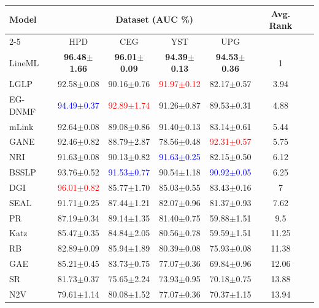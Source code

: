 \documentclass[pdflatex,sn-mathphys-num]{sn-jnl}%
\theoremstyle{thmstyleone}%
\theoremstyle{thmstyletwo}%
\theoremstyle{thmstylethree}%
\theoremstyle{plain} %
\theoremstyle{definition} %
\theoremstyle{remark} %
\theoremstyle{plain} %
\begin{document}
\begin{table}[ht!]
\begin{tabular}{@{}lcccccr@{}}
\end{tabular}

\begin{tabular}{@{}lcccccr@{}}
\toprule
\multirow{2}{*}{Model} & \multicolumn{4}{c}{Dataset (AUC \%)} & \multirow{2}{*}{Avg. Rank} \\
\cmidrule(lr){2-5}
& HPD & CEG & YST & UPG & \\
\midrule
LineML & \textbf{96.48$\pm$1.66} & \textbf{96.01$\pm$0.09} & \textbf{94.39$\pm$0.13} & \textbf{94.53$\pm$0.36} & 1 \\
LGLP & 92.58$\pm$0.08 & 90.16$\pm$0.76 & \textcolor{red}{91.97$\pm$0.12} & 82.17$\pm$0.57 & 3.94 \\
EG-DNMF & \textcolor{blue}{94.49$\pm$0.37} & \textcolor{red}{92.89$\pm$1.74} & 91.26$\pm$0.87 & 89.53$\pm$0.31 & 4.88 \\
mLink & 92.64$\pm$0.08 & 89.08$\pm$0.86 & 91.40$\pm$0.13 & 83.14$\pm$0.61 & 5.44 \\
GANE & 92.46$\pm$0.82 & 88.79$\pm$2.87 & 78.56$\pm$0.48 & \textcolor{red}{92.31$\pm$0.57} & 5.75 \\
NRI & 91.63$\pm$0.08 & 90.13$\pm$0.82 & \textcolor{blue}{91.63$\pm$0.25} & 82.15$\pm$0.50 & 6.12 \\
BSSLP & 93.76$\pm$0.52 & \textcolor{blue}{91.53$\pm$0.77} & 90.54$\pm$1.18 & \textcolor{blue}{90.92$\pm$0.05} & 6.25 \\
DGI & \textcolor{red}{96.01$\pm$0.82} & 85.77$\pm$1.70 & 85.03$\pm$0.55 & 83.43$\pm$0.16 & 7 \\
SEAL & 91.71$\pm$0.25 & 87.44$\pm$1.21 & 82.07$\pm$0.96 & 81.37$\pm$0.93 & 7.62 \\
PR & 87.19$\pm$0.34 & 89.14$\pm$1.35 & 81.40$\pm$0.75 & 59.88$\pm$1.51 & 9.5 \\
Katz & 85.47$\pm$0.35 & 84.84$\pm$2.05 & 80.56$\pm$0.78 & 59.59$\pm$1.51 & 11.25 \\
RB & 82.89$\pm$0.09 & 85.94$\pm$1.89 & 80.39$\pm$0.08 & 75.93$\pm$0.08 & 11.38 \\
GAE & 85.21$\pm$0.45 & 83.73$\pm$0.75 & 77.07$\pm$0.36 & 69.84$\pm$0.96 & 12.06 \\
SR & 81.73$\pm$0.37 & 75.65$\pm$2.24 & 73.93$\pm$0.95 & 70.18$\pm$0.75 & 13.88\\
N2V & 79.61$\pm$1.14 & 80.08$\pm$1.52 & 77.07$\pm$0.36 & 70.37$\pm$1.15 & 13.94 \\
\bottomrule
\end{tabular}
\end{table}

\newpage
\end{document}

